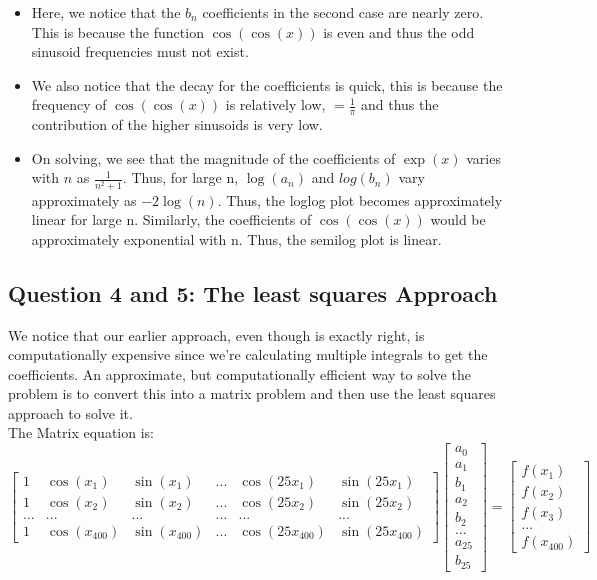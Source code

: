 \documentclass[11pt, a4paper]{article}
\begin{document}
\begin{itemize}
\item Here, we notice that the $b_n$ coefficients in the second case are nearly zero. This is because the function $\cos(\cos(x))$ is even and thus the odd sinusoid frequencies must not exist. 
\item We also notice that the decay for the coefficients is quick, this is because the frequency of $\cos(\cos(x))$ is relatively low, $=\frac{1}{\pi}$ and thus the contribution of the higher sinusoids is very low. 
\item On solving, we see that the magnitude of the coefficients of $\exp(x)$ varies with $n$ as $\frac{1}{n^2+1}$. Thus, for large n, $\log(a_n)$ and $log(b_n)$ vary approximately as $-2\log(n)$. Thus, the loglog plot becomes approximately linear for large n. Similarly, the coefficients of $\cos(\cos(x))$ would be approximately exponential with n. Thus, the semilog plot is linear.
\end{itemize}




\subsection{Question 4 and 5: The least squares Approach}
We notice that our earlier approach, even though is exactly right, is computationally expensive since we're calculating multiple integrals to get the coefficients. An approximate, but computationally efficient way to solve the problem is to convert this into a matrix problem and then use the least squares approach to solve it. \\
The Matrix equation is:
\[
\begin{bmatrix}
1 & \cos(x_1) & \sin(x_1) & ... & \cos(25x_1) & \sin(25x_1)\\
1 & \cos(x_2) & \sin(x_2) & ... & \cos(25x_2) & \sin(25x_2)\\
... & ... & ... & ... & ... & ...\\
1 & \cos(x_{400}) & \sin(x_{400}) & ... & \cos(25x_{400}) & \sin(25x_{400})
\end{bmatrix}
\begin{bmatrix}
a_0\\
a_1\\
b_1\\
a_2\\
b_2\\
...\\
a_{25}\\
b_{25}
\end{bmatrix}=
\begin{bmatrix}
f(x_1)\\
f(x_2)\\
f(x_3)\\
...\\
f(x_{400})
\end{bmatrix}
\]
\end{document}
